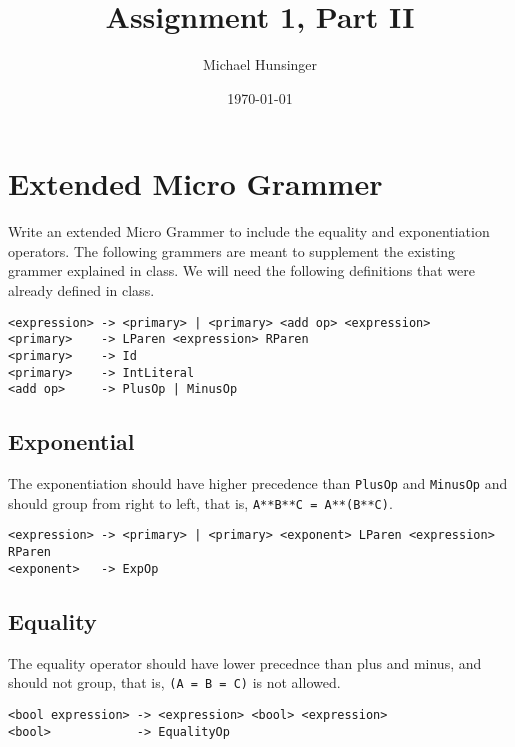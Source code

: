 \documentclass[11pt]{article}
\author{Michael Hunsinger}
\date{\today}
\title{Assignment 1, Part II}
\begin{document}
\maketitle

\section{Extended Micro Grammer}
\label{sec-1}
Write an extended Micro Grammer to include the equality and exponentiation
operators. The following grammers are meant to supplement the existing 
grammer explained in class.\newline
We will need the following definitions that were already defined in class.
\begin{verbatim}
<expression> -> <primary> | <primary> <add op> <expression>
<primary>    -> LParen <expression> RParen
<primary>    -> Id
<primary>    -> IntLiteral
<add op>     -> PlusOp | MinusOp
\end{verbatim}

\subsection{Exponential}
\label{sec-1-1}
The exponentiation should have higher precedence than \texttt{PlusOp} and 
\texttt{MinusOp} and should group from right to left, that is, 
\texttt{A**B**C = A**(B**C)}.
\begin{verbatim}
<expression> -> <primary> | <primary> <exponent> LParen <expression> RParen
<exponent>   -> ExpOp
\end{verbatim}

\subsection{Equality}
\label{sec-1-2}
The equality operator should have lower precednce than plus and minus,
and should not group, that is, \texttt{(A = B = C)} is not allowed.
\begin{verbatim}
<bool expression> -> <expression> <bool> <expression>
<bool>            -> EqualityOp
\end{verbatim}
\end{document}
